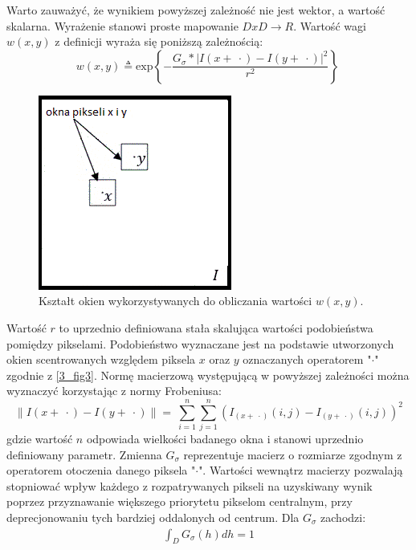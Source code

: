 \documentclass[12pt, twoside, openany]{report}
\theoremstyle{definition}
\begin{document}
Warto zauważyć, że wynikiem powyższej zależność nie jest wektor, a wartość skalarna. Wyrażenie stanowi proste mapowanie $DxD\longrightarrow R$. Wartość wagi $w(x,y)$ z definicji wyraża się poniższą zależnością:
\begin{equation}
w\left(x,y\right)\triangleq {\mathrm{exp} \left\{-\frac{G_{\sigma }*{\left|I\left(x+\ \cdot \right)-I\left(y+\ \cdot \right)\right|}^2}{r^2}\right\}\ }
\label{NLWEIGHT}
\end{equation}
\begin{figure}[!h]
	\centering
	\includegraphics[scale=1]{rysunki/3_fig3.png}
	\caption{Kształt okien wykorzystywanych do obliczania wartości $w(x,y)$.}
	\label{3_fig3}
\end{figure}
Wartość $r$ to uprzednio definiowana stała skalująca wartości podobieństwa pomiędzy pikselami. Podobieństwo wyznaczane jest na podstawie utworzonych okien scentrowanych względem piksela $x$ oraz $y$ oznaczanych operatorem "$\cdot$" zgodnie z \autoref{3_fig3}. Normę macierzową występującą w powyższej zależności można wyznaczyć korzystając z normy Frobeniusa:
\begin{equation}
{\|I\left(x+\ \cdot \right)-I\left(y+\ \cdot \right)\|}=\ \sum^n_{i=1}{\sum^n_{j=1}{{\left(I_{(x+\ \cdot) }\left(i,j\right)-I_{(y+\ \cdot)}\left(i,j\right)\right)}^2}}
\label{FROBENIUS}
\end{equation}
gdzie wartość $n$ odpowiada wielkości badanego okna i stanowi uprzednio definiowany parametr. Zmienna $G_\sigma$ reprezentuje macierz o rozmiarze zgodnym z operatorem otoczenia danego piksela "$\cdot$". Wartości wewnątrz macierzy pozwalają stopniować wpływ każdego z rozpatrywanych pikseli na uzyskiwany wynik poprzez przyznawanie większego priorytetu pikselom centralnym, przy deprecjonowaniu tych bardziej oddalonych od centrum. Dla $G_\sigma$ zachodzi:
\begin{align}
\int_{D}G_{\sigma}(h)dh = 1
\end{align}
\end{document}
